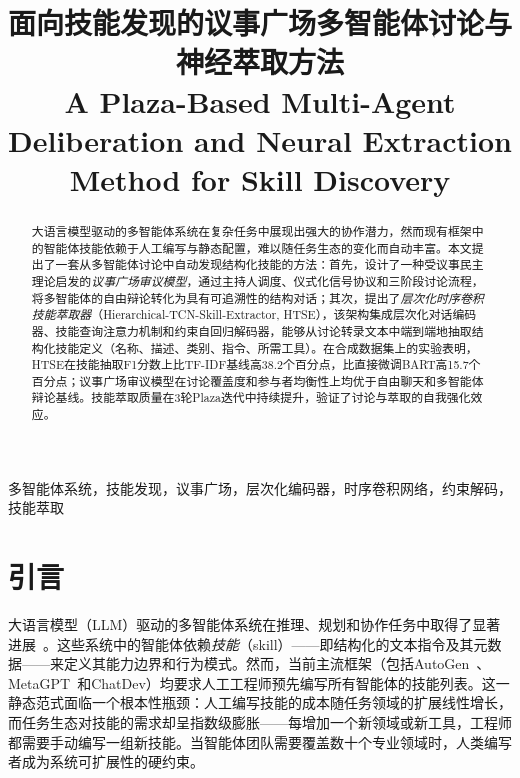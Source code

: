 \documentclass[conference]{IEEEtran}
\begin{document}
\title{面向技能发现的议事广场多智能体讨论与神经萃取方法\\
\large{A Plaza-Based Multi-Agent Deliberation and Neural Extraction Method for Skill Discovery}}

\author{}
\maketitle

\begin{abstract}
大语言模型驱动的多智能体系统在复杂任务中展现出强大的协作潜力，然而现有框架中的智能体技能依赖于人工编写与静态配置，难以随任务生态的变化而自动丰富。本文提出了一套从多智能体讨论中自动发现结构化技能的方法：首先，设计了一种受议事民主理论启发的\emph{议事广场审议模型}，通过主持人调度、仪式化信号协议和三阶段讨论流程，将多智能体的自由辩论转化为具有可追溯性的结构对话；其次，提出了\emph{层次化时序卷积技能萃取器}（Hierarchical-TCN-Skill-Extractor, HTSE），该架构集成层次化对话编码器、技能查询注意力机制和约束自回归解码器，能够从讨论转录文本中端到端地抽取结构化技能定义（名称、描述、类别、指令、所需工具）。在合成数据集上的实验表明，HTSE在技能抽取F1分数上比TF-IDF基线高38.2个百分点，比直接微调BART高15.7个百分点；议事广场审议模型在讨论覆盖度和参与者均衡性上均优于自由聊天和多智能体辩论基线。技能萃取质量在3轮Plaza迭代中持续提升，验证了讨论与萃取的自我强化效应。
\end{abstract}

\begin{IEEEkeywords}
多智能体系统，技能发现，议事广场，层次化编码器，时序卷积网络，约束解码，技能萃取
\end{IEEEkeywords}

\section{引言}

大语言模型（LLM）驱动的多智能体系统在推理、规划和协作任务中取得了显著进展~\cite{wu2023autogen,park2023generative,hong2023metagpt}。这些系统中的智能体依赖\emph{技能}（skill）——即结构化的文本指令及其元数据——来定义其能力边界和行为模式。然而，当前主流框架（包括AutoGen~\cite{wu2023autogen}、MetaGPT~\cite{hong2023metagpt}和ChatDev）均要求人工工程师预先编写所有智能体的技能列表。这一静态范式面临一个根本性瓶颈：人工编写技能的成本随任务领域的扩展线性增长，而任务生态对技能的需求却呈指数级膨胀——每增加一个新领域或新工具，工程师都需要手动编写一组新技能。当智能体团队需要覆盖数十个专业领域时，人类编写者成为系统可扩展性的硬约束。
\end{document}
